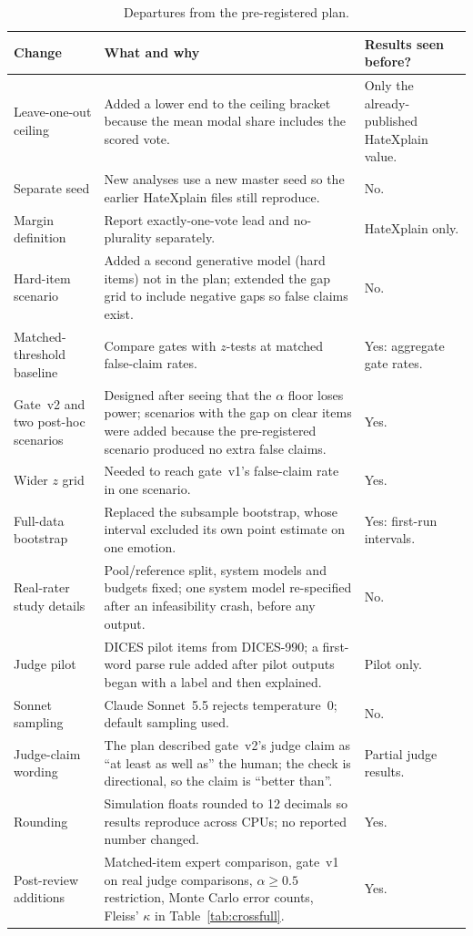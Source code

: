 \begin{table}[t]
\centering\small
\begin{tabular}{@{}p{}p{}p{}@{}}
\toprule
Change & What and why & Results seen before? \\
\midrule
Leave-one-out ceiling & Added a lower end to the ceiling bracket because the mean modal share includes the scored vote. & Only the already-published HateXplain value. \\
Separate seed & New analyses use a new master seed so the earlier HateXplain files still reproduce. & No. \\
Margin definition & Report exactly-one-vote lead and no-plurality separately. & HateXplain only. \\
Hard-item scenario & Added a second generative model (hard items) not in the plan; extended the gap grid to include negative gaps so false claims exist. & No. \\
Matched-threshold baseline & Compare gates with $z$-tests at matched false-claim rates. & Yes: aggregate gate rates. \\
Gate~v2 and two post-hoc scenarios & Designed after seeing that the $\alpha$ floor loses power; scenarios with the gap on clear items were added because the pre-registered scenario produced no extra false claims. & Yes. \\
Wider $z$ grid & Needed to reach gate~v1's false-claim rate in one scenario. & Yes. \\
Full-data bootstrap & Replaced the subsample bootstrap, whose interval excluded its own point estimate on one emotion. & Yes: first-run intervals. \\
Real-rater study details & Pool/reference split, system models and budgets fixed; one system model re-specified after an infeasibility crash, before any output. & No. \\
Judge pilot & DICES pilot items from DICES-990; a first-word parse rule added after pilot outputs began with a label and then explained. & Pilot only. \\
Sonnet sampling & Claude Sonnet~5.5 rejects temperature~0; default sampling used. & No. \\
Judge-claim wording & The plan described gate~v2's judge claim as ``at least as well as'' the human; the check is directional, so the claim is ``better than''. & Partial judge results. \\
Rounding & Simulation floats rounded to 12 decimals so results reproduce across CPUs; no reported number changed. & Yes. \\
Post-review additions & Matched-item expert comparison, gate~v1 on real judge comparisons, $\alpha\geq0.5$ restriction, Monte Carlo error counts, Fleiss' $\kappa$ in Table~\ref{tab:crossfull}. & Yes. \\
\bottomrule
\end{tabular}
\caption{Departures from the pre-registered plan.}
\label{tab:dev}
\end{table}

